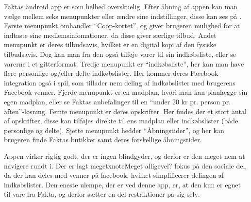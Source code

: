 Faktas android app er som helhed overskuelig.
Efter åbning af appen kan man vælge mellem seks menupunkter eller ændre sine indstillinger, disse kan ses på .
Første menupunkt omhandler ``Coop-kortet'', og giver brugeren mulighed for at indtaste sine medlemsinfomationer, da disse giver særlige tilbud.
Andet menupunkt er deres tilbudsavis, hvilket er en digital kopi af den fysiske tilbudsavis.
Dog kan man fra den også tilføje varer til sin indkøbsliste, eller se varerne i et gitterformat.
Tredje menupunkt er ``indkøbsliste'', her kan man have flere personlige og/eller delte indkøbslister.
Her kommer deres Facebook integration også i spil, som tillader nem deling af indkøbslister med brugerens Facebook venner.
Fjerde menupunkt er en madplan, hvori man kan planlægge sin egen madplan, eller se Faktas anbefalinger til en ``under 20 kr pr. person pr. aften''-løsning.
Femte menupunkt er deres opskrifter.
Her findes der et stort antal af opskrifter, disse kan tilføjes direkte til ens madplan eller indkøbslister (både personlige og delte).
Sjette menupunkt hedder ``Åbningstider'', og her kan brugeren finde Faktas butikker samt deres forskellige åbningstider.

Appen virker rigtig godt, der er ingen blindgyder, og derfor er den meget nem at navigere rundt i. Der er lagt megetxnote{Meget alligevel?} fokus på den sociale del, da der kan deles med venner på facebook, hvilket simplificerer delingen af indkøbslister. Den eneste ulempe, der er ved denne app, er, at den kun er egnet til vare fra Fakta, og derfor sætter en del restriktioner på sig selv.

